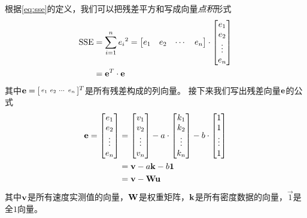 根据\cref{eq:sse}的定义，我们可以把残差平方和写成向量\emph{点积}形式
\begin{equation}\label{eq:sse-vec}
    \begin{split}
        \text{SSE}&=\sum_{i=1}^n {e_i}^2=
        \begin{bmatrix}
            e_1 & e_2 &\cdots & e_n
        \end{bmatrix}
        \cdot
        \begin{bmatrix}
            e_1 \\
            e_2 \\
            \vdots\\
            e_n
        \end{bmatrix}\\
        &=\mathbf{e}^T\cdot\mathbf{e}
    \end{split}
\end{equation}
其中$\mathbf{e}=[\begin{smallmatrix}
    e_1 & e_2 & \cdots & e_n
\end{smallmatrix}]^T$是所有残差构成的列向量。
接下来我们写出残差向量$\mathbf{e}$的公式
\begin{equation}\label{eq:e-vec}
    \begin{split}
        \mathbf{e}=
        \begin{bmatrix}
            e_1 \\
            e_2 \\
            \vdots\\
            e_n
        \end{bmatrix}&=
        \begin{bmatrix}
            v_1 \\
            v_2 \\
            \vdots\\
            v_n
        \end{bmatrix}-
        a\cdot
        \begin{bmatrix}
            k_1 \\
            k_2 \\
            \vdots\\
            k_n
        \end{bmatrix}-
        b\cdot
        \begin{bmatrix}
            1 \\
            1 \\
            \vdots\\
            1
        \end{bmatrix}\\
        &=\mathbf{v}-a\mathbf{k}-b\mathbf{1}\\
        &=\mathbf{v}-\mathbf{W}\mathbf{u}
    \end{split}
\end{equation}
其中$\mathbf{v}$是所有速度实测值的向量，$\mathbf{W}$是权重矩阵，$\mathbf{k}$是所有密度数据的向量，$\vec{1}$是全$1$向量。

